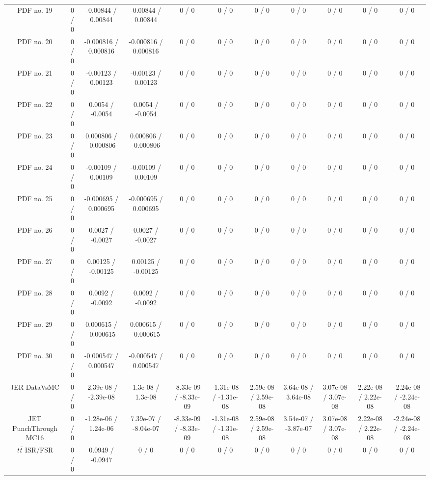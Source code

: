 {\begin{landscape}
\begin{longtable}{@{\extracolsep{\fill}}| *{11}{c|}}
  PDF no. 19 & 0 / 0 & -0.00844 / 0.00844 & -0.00844 / 0.00844 & 0 / 0 & 0 / 0 & 0 / 0 & 0 / 0 & 0 / 0 & 0 / 0 & 0 / 0 \\ 
  PDF no. 20 & 0 / 0 & -0.000816 / 0.000816 & -0.000816 / 0.000816 & 0 / 0 & 0 / 0 & 0 / 0 & 0 / 0 & 0 / 0 & 0 / 0 & 0 / 0 \\ 
  PDF no. 21 & 0 / 0 & -0.00123 / 0.00123 & -0.00123 / 0.00123 & 0 / 0 & 0 / 0 & 0 / 0 & 0 / 0 & 0 / 0 & 0 / 0 & 0 / 0 \\ 
  PDF no. 22 & 0 / 0 & 0.0054 / -0.0054 & 0.0054 / -0.0054 & 0 / 0 & 0 / 0 & 0 / 0 & 0 / 0 & 0 / 0 & 0 / 0 & 0 / 0 \\ 
  PDF no. 23 & 0 / 0 & 0.000806 / -0.000806 & 0.000806 / -0.000806 & 0 / 0 & 0 / 0 & 0 / 0 & 0 / 0 & 0 / 0 & 0 / 0 & 0 / 0 \\ 
  PDF no. 24 & 0 / 0 & -0.00109 / 0.00109 & -0.00109 / 0.00109 & 0 / 0 & 0 / 0 & 0 / 0 & 0 / 0 & 0 / 0 & 0 / 0 & 0 / 0 \\ 
  PDF no. 25 & 0 / 0 & -0.000695 / 0.000695 & -0.000695 / 0.000695 & 0 / 0 & 0 / 0 & 0 / 0 & 0 / 0 & 0 / 0 & 0 / 0 & 0 / 0 \\ 
  PDF no. 26 & 0 / 0 & 0.0027 / -0.0027 & 0.0027 / -0.0027 & 0 / 0 & 0 / 0 & 0 / 0 & 0 / 0 & 0 / 0 & 0 / 0 & 0 / 0 \\ 
  PDF no. 27 & 0 / 0 & 0.00125 / -0.00125 & 0.00125 / -0.00125 & 0 / 0 & 0 / 0 & 0 / 0 & 0 / 0 & 0 / 0 & 0 / 0 & 0 / 0 \\ 
  PDF no. 28 & 0 / 0 & 0.0092 / -0.0092 & 0.0092 / -0.0092 & 0 / 0 & 0 / 0 & 0 / 0 & 0 / 0 & 0 / 0 & 0 / 0 & 0 / 0 \\ 
  PDF no. 29 & 0 / 0 & 0.000615 / -0.000615 & 0.000615 / -0.000615 & 0 / 0 & 0 / 0 & 0 / 0 & 0 / 0 & 0 / 0 & 0 / 0 & 0 / 0 \\ 
  PDF no. 30 & 0 / 0 & -0.000547 / 0.000547 & -0.000547 / 0.000547 & 0 / 0 & 0 / 0 & 0 / 0 & 0 / 0 & 0 / 0 & 0 / 0 & 0 / 0 \\ 
  JER DataVsMC & 0 / 0 & -2.39e-08 / -2.39e-08 & 1.3e-08 / 1.3e-08 & -8.33e-09 / -8.33e-09 & -1.31e-08 / -1.31e-08 & 2.59e-08 / 2.59e-08 & 3.64e-08 / 3.64e-08 & 3.07e-08 / 3.07e-08 & 2.22e-08 / 2.22e-08 & -2.24e-08 / -2.24e-08 \\ 
  JET PunchThrough MC16 & 0 / 0 & -1.28e-06 / 1.24e-06 & 7.39e-07 / -8.04e-07 & -8.33e-09 / -8.33e-09 & -1.31e-08 / -1.31e-08 & 2.59e-08 / 2.59e-08 & 3.54e-07 / -3.87e-07 & 3.07e-08 / 3.07e-08 & 2.22e-08 / 2.22e-08 & -2.24e-08 / -2.24e-08 \\ 
$  \it{t\bar{t}}$ ISR/FSR & 0 / 0 & 0.0949 / -0.0947 & 0 / 0 & 0 / 0 & 0 / 0 & 0 / 0 & 0 / 0 & 0 / 0 & 0 / 0 & 0 / 0 \\ 

\end{longtable}
\end{landscape}}
